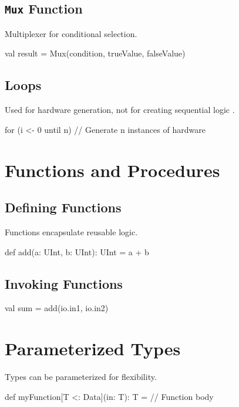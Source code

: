 \subsection{\texttt{Mux} Function}
Multiplexer for conditional selection.
\begin{chiselcode}
val result = Mux(condition, trueValue, falseValue)
\end{chiselcode}

\subsection{Loops}
Used for hardware generation, not for creating sequential logic \cite{chisel-tutorial}.
\begin{chiselcode}
for (i <- 0 until n) {
  // Generate n instances of hardware
}
\end{chiselcode}

\section{Functions and Procedures}
\subsection{Defining Functions}
Functions encapsulate reusable logic.
\begin{chiselcode}
def add(a: UInt, b: UInt): UInt = {
  a + b
}
\end{chiselcode}

\subsection{Invoking Functions}
\begin{chiselcode}
val sum = add(io.in1, io.in2)
\end{chiselcode}

\section{Parameterized Types}
Types can be parameterized for flexibility.
\begin{chiselcode}
def myFunction[T <: Data](in: T): T = {
  // Function body
}
\end{chiselcode}


